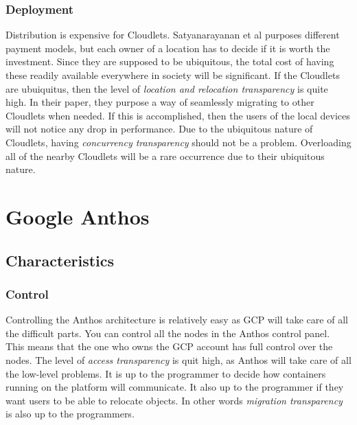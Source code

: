 \subsubsection{Deployment}
Distribution is expensive for Cloudlets. Satyanarayanan et al\cite{satyanarayanan_case_2009} purposes different payment models, but each owner of a location has to decide if it is worth the investment. Since they are supposed to be ubiquitous, the total cost of having these readily available everywhere in society will be significant. If the Cloudlets are ubuiquitus, then the level of \textit{location and relocation transparency} is quite high. In their paper, they purpose a way of seamlessly migrating to other Cloudlets when needed. If this is accomplished, then the users of the local devices will not notice any drop in performance. Due to the ubiquitous nature of Cloudlets, having \textit{concurrency transparency} should not be a problem. Overloading all of the nearby Cloudlets will be a rare occurrence due to their ubiquitous nature.














\section{Google Anthos}
\subsection{Characteristics}
\subsubsection{Control}
Controlling the Anthos architecture is relatively easy as GCP will take care of all the difficult parts. You can control all the nodes in the Anthos control panel. This means that the one who owns the GCP account has full control over the nodes. The level of \textit{access  transparency} is quit high, as Anthos will take care of all the low-level problems. It is up to the programmer to decide how containers running on the platform will communicate. It also up to the programmer if they want users to be able to relocate objects. In other words \textit{migration transparency} is also up to the programmers.

